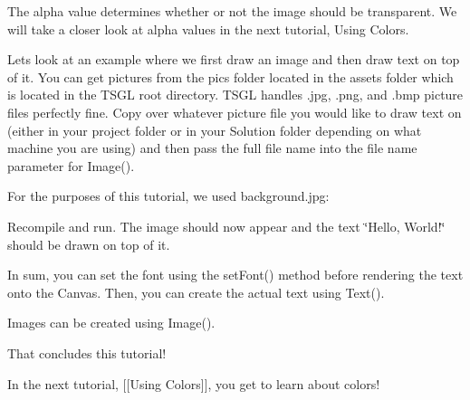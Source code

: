 The alpha value determines whether or not the image should be transparent. We will take a closer look at alpha values in the next tutorial, Using Colors.

Let\textquotesingle{}s look at an example where we first draw an image and then draw text on top of it. You can get pictures from the {\ttfamily pics} folder located in the {\ttfamily assets} folder which is located in the T\+S\+GL root directory. T\+S\+GL handles {\ttfamily .jpg}, {\ttfamily .png}, and {\ttfamily .bmp} picture files perfectly fine. Copy over whatever picture file you would like to draw text on (either in your project folder or in your Solution folder depending on what machine you are using) and then pass the full file name into the file name parameter for {\ttfamily Image()}.

For the purposes of this tutorial, we used {\ttfamily background.\+jpg}\+:


\begin{DoxyCode}{0}
\DoxyCodeLine{\textcolor{preprocessor}{\#include <tsgl.h>}}
\DoxyCodeLine{}
\DoxyCodeLine{  \textcolor{comment}{//We will explain what getWindowWidth()}}
\DoxyCodeLine{  \textcolor{comment}{//and getWindowHeight() do in the next tutorial}}
\DoxyCodeLine{\}}
\end{DoxyCode}


Recompile and run. The image should now appear and the text \char`\"{}\+Hello, World!\char`\"{} should be drawn on top of it.

In sum, you can set the font using the {\ttfamily set\+Font()} method before rendering the text onto the Canvas. Then, you can create the actual text using {\ttfamily Text()}.

Images can be created using {\ttfamily Image()}.

That concludes this tutorial!

In the next tutorial, \mbox{[}\mbox{[}Using Colors\mbox{]}\mbox{]}, you get to learn about colors! 